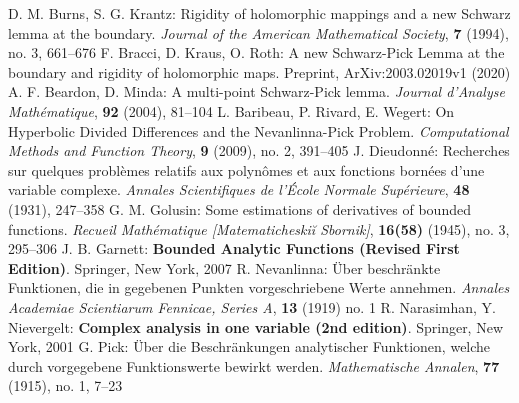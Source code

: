 \begin{thebibliography}{widest entry}
   D. M. Burns, S. G. Krantz: Rigidity of holomorphic mappings and a new Schwarz lemma at the boundary. \textit{Journal of the American Mathematical Society}, \textbf{7} (1994), no. 3, 661--676
   F. Bracci, D. Kraus, O. Roth: A new Schwarz-Pick Lemma at the boundary and rigidity of holomorphic maps. Preprint, ArXiv:2003.02019v1 (2020)
   A. F. Beardon, D. Minda: A multi-point Schwarz-Pick lemma. \textit{Journal d'Analyse Mathématique}, \textbf{92} (2004), 81--104
   L. Baribeau, P. Rivard, E. Wegert: On Hyperbolic Divided Differences and the Nevanlinna-Pick Problem. \textit{ Computational Methods and Function Theory}, \textbf{9} (2009), no. 2, 391--405
   J. Dieudonné: Recherches sur quelques problèmes relatifs aux polynômes et aux fonctions bornées d'une variable complexe. \textit{Annales Scientifiques de l'École Normale Supérieure}, \textbf{48} (1931), 247--358
   G. M. Golusin: Some estimations of derivatives of bounded functions. \textit{Recueil Mathématique [Matematicheskiĭ Sbornik]}, \textbf{16(58)} (1945), no. 3, 295--306
   J. B. Garnett: \textbf{Bounded Analytic Functions (Revised First Edition)}. Springer, New York, 2007
   R. Nevanlinna: Über beschränkte Funktionen, die in gegebenen Punkten vorgeschriebene Werte annehmen. \textit{Annales Academiae Scientiarum Fennicae, Series A}, \textbf{13} (1919) no. 1
   R. Narasimhan, Y. Nievergelt: \textbf{Complex analysis in one variable (2nd edition)}. Springer, New York, 2001
   G. Pick: Über die Beschränkungen analytischer Funktionen, welche durch vorgegebene Funktionswerte bewirkt werden. \textit{ Mathematische Annalen}, \textbf{77} (1915), no. 1, 7--23
\end{thebibliography}
